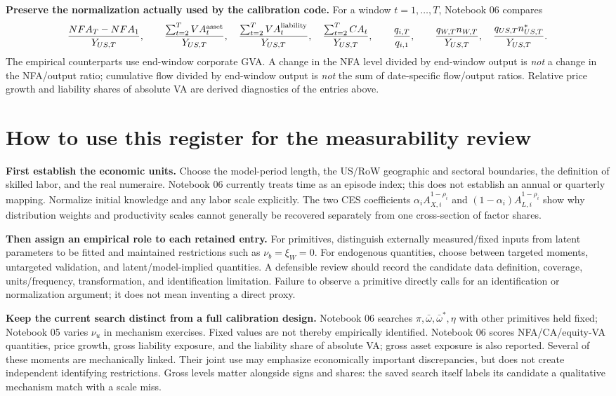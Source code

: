 \documentclass[10pt,a4paper,landscape]{article}
\begin{document}
\textbf{Preserve the normalization actually used by the calibration code.}
For a window $t=1,\ldots,T$, Notebook 06 compares
\[
\frac{NFA_T-NFA_1}{Y_{US,T}},\qquad
\frac{\sum_{t=2}^T VA_t^{\rm asset}}{Y_{US,T}},\quad
\frac{\sum_{t=2}^T VA_t^{\rm liability}}{Y_{US,T}},\quad
\frac{\sum_{t=2}^T CA_t}{Y_{US,T}},\qquad
\frac{q_{i,T}}{q_{i,1}},\qquad
\frac{q_{W,T}n_{W,T}}{Y_{US,T}},\quad
\frac{q_{US,T}n_{US,T}^*}{Y_{US,T}}.
\]
The empirical counterparts use end-window corporate GVA. A change in the NFA level divided by end-window output is \emph{not} a change in the NFA/output ratio; cumulative flow divided by end-window output is \emph{not} the sum of date-specific flow/output ratios. Relative price growth and liability shares of absolute VA are derived diagnostics of the entries above.

\clearpage
\section{How to use this register for the measurability review}

\textbf{First establish the economic units.} Choose the model-period length, the US/RoW geographic and sectoral boundaries, the definition of skilled labor, and the real numeraire. Notebook 06 currently treats time as an episode index; this does not establish an annual or quarterly mapping. Normalize initial knowledge and any labor scale explicitly. The two CES coefficients $\alpha_iA_{X,i}^{1-\rho_i}$ and $(1-\alpha_i)A_{L,i}^{1-\rho_i}$ show why distribution weights and productivity scales cannot generally be recovered separately from one cross-section of factor shares.

\textbf{Then assign an empirical role to each retained entry.} For primitives, distinguish externally measured/fixed inputs from latent parameters to be fitted and maintained restrictions such as $\nu_b=\xi_W=0$. For endogenous quantities, choose between targeted moments, untargeted validation, and latent/model-implied quantities. A defensible review should record the candidate data definition, coverage, units/frequency, transformation, and identification limitation. Failure to observe a primitive directly calls for an identification or normalization argument; it does not mean inventing a direct proxy.

\textbf{Keep the current search distinct from a full calibration design.} Notebook 06 searches $\pi,\bar\omega,\bar\omega^*,\eta$ with other primitives held fixed; Notebook 05 varies $\nu_u$ in mechanism exercises. Fixed values are not thereby empirically identified. Notebook 06 scores NFA/CA/equity-VA quantities, price growth, gross liability exposure, and the liability share of absolute VA; gross asset exposure is also reported. Several of these moments are mechanically linked. Their joint use may emphasize economically important discrepancies, but does not create independent identifying restrictions. Gross levels matter alongside signs and shares: the saved search itself labels its candidate a qualitative mechanism match with a scale miss.
\end{document}
